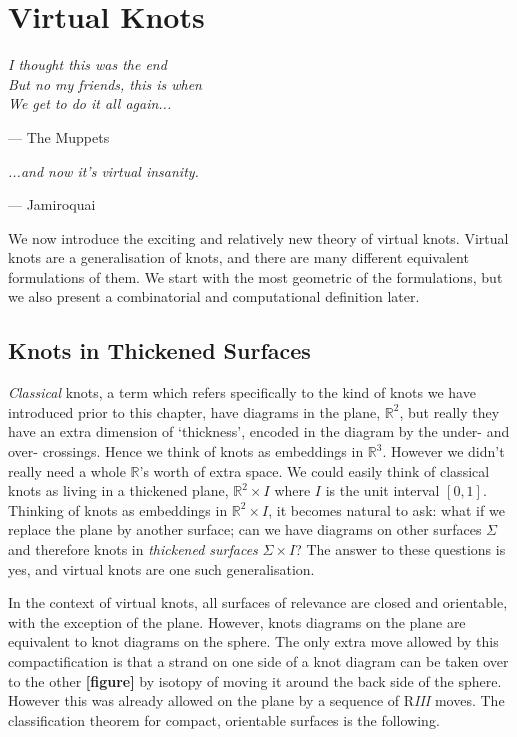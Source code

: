 \documentclass[12pt]{report}
\newcommand{\R}{\mathbb{R}}
\newcommand{\notered}[1]{{\color{Red} \textbf{#1}}}
\begin{document}
\chapter{Virtual Knots}

\epigraph{\itshape I thought this was the end\\But no my friends, this is when\\We get to do it all again...}{--- The Muppets}
\epigraph{\itshape ...and now it's virtual insanity.}{--- Jamiroquai}


We now introduce the exciting and relatively new theory of virtual knots. Virtual knots are a generalisation of knots, and there are many different equivalent formulations of them. We start with the most geometric of the formulations, but we also present a combinatorial and computational definition later.


\section{Knots in Thickened Surfaces}

\textit{Classical} knots, a term which refers specifically to the kind of knots we have introduced prior to this chapter, have diagrams in the plane, $\R^{2}$, but really they have an extra dimension of `thickness', encoded in the diagram by the under- and over- crossings. Hence we think of knots as embeddings in $\R^{3}$. However we didn't really need a whole $\R$'s worth of extra space. We could easily think of classical knots as living in a thickened plane, $\R^{2} \times I$ where $I$ is the unit interval $[0, 1]$. Thinking of knots as embeddings in $\R^{2} \times I$, it becomes natural to ask: what if we replace the plane by another surface; can we have diagrams on other surfaces $\Sigma$ and therefore knots in \textit{thickened surfaces} $\Sigma \times I$? The answer to these questions is yes, and virtual knots are one such generalisation.

In the context of virtual knots, all surfaces of relevance are closed and orientable, with the exception of the plane. However, knots diagrams on the plane are equivalent to knot diagrams on the sphere. The only extra move allowed by this compactification is that a strand on one side of a knot diagram can be taken over to the other \notered{[figure]} by isotopy of moving it around the back side of the sphere. However this was already allowed on the plane by a sequence of R\textit{III} moves.  The classification theorem for compact, orientable surfaces is the following.
\end{document}
